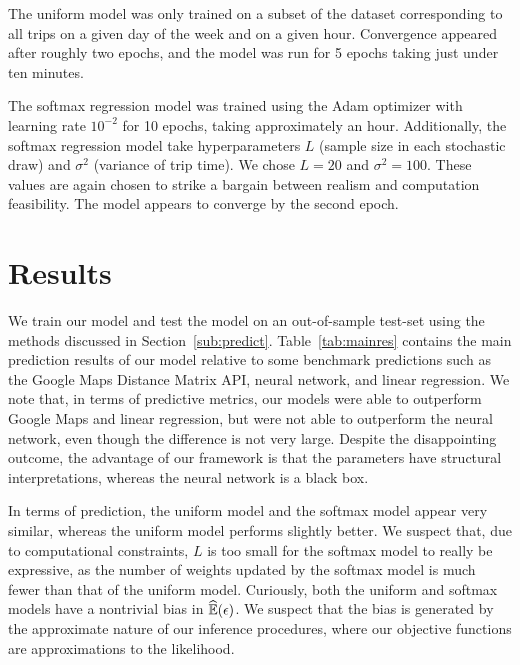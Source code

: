 \documentclass{article}
\begin{document}
The uniform model was only trained on a subset of the
dataset corresponding to all trips on a given day of the week and on a given
hour. Convergence appeared after roughly two epochs, and the model was run for 5
epochs taking just under ten minutes.

The softmax regression model was trained
using the Adam optimizer \cite{kingma2014adam} with learning rate $10^{-2}$ for 10 epochs,
taking approximately an hour. Additionally, the softmax regression model take hyperparameters $L$ (sample size in each stochastic draw) and $\sigma^2$ (variance of trip time). We chose $L = 20$ and $\sigma^2 = 100$. These values are again chosen to strike a bargain between realism and computation feasibility. The model appears to converge by the second epoch. 

\section{Results}


We train our model and test the model on an out-of-sample test-set using the methods discussed in Section~\ref{sub:predict}. Table~\ref{tab:mainres} contains the main prediction results of our model relative to some benchmark predictions
such as the Google Maps Distance Matrix API, neural network, and linear regression. We note that, in terms of predictive metrics, our models were able to outperform Google Maps and linear regression, but were not able to outperform the neural network, even though the difference is not very large. Despite the disappointing outcome, the advantage of our framework is that the parameters have structural interpretations, whereas the neural network is a black box. 

In terms of prediction, the uniform model and the softmax model appear very similar, whereas the uniform model performs slightly better. We suspect that, due to computational constraints, $L$ is too small for the softmax model to really be expressive, as the number of weights updated by the softmax model is much fewer than that of the uniform model. Curiously, both the uniform and softmax models have a nontrivial bias in $\widehat{\mathbb{E}}(\epsilon)$. We suspect that the bias is generated by the approximate nature of our inference procedures, where our objective functions are approximations to the likelihood.
\end{document}
